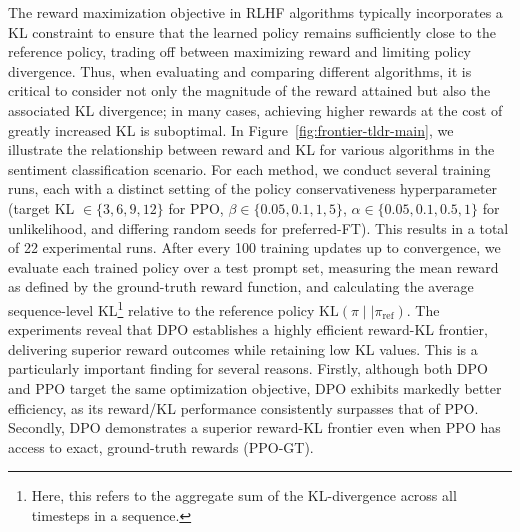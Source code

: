 The reward maximization objective in RLHF algorithms typically incorporates a KL constraint to ensure that the learned policy remains sufficiently close to the reference policy, trading off between maximizing reward and limiting policy divergence. Thus, when evaluating and comparing different algorithms, it is critical to consider not only the magnitude of the reward attained but also the associated KL divergence; in many cases, achieving higher rewards at the cost of greatly increased KL is suboptimal. In Figure~\ref{fig:frontier-tldr-main}, we illustrate the relationship between reward and KL for various algorithms in the sentiment classification scenario. For each method, we conduct several training runs, each with a distinct setting of the policy conservativeness hyperparameter (target KL $\in\{3,6,9,12\}$ for PPO, $\beta \in \{0.05,0.1,1,5\}$, $\alpha\in\{0.05,0.1,0.5,1\}$ for unlikelihood, and differing random seeds for preferred-FT). This results in a total of 22 experimental runs. After every 100 training updates up to convergence, we evaluate each trained policy over a test prompt set, measuring the mean reward as defined by the ground-truth reward function, and calculating the average sequence-level KL\footnote{Here, this refers to the aggregate sum of the KL-divergence across all timesteps in a sequence.} relative to the reference policy $\text{KL}\left(\pi\mid \mid \pi_\text{ref}\right)$. The experiments reveal that DPO establishes a highly efficient reward-KL frontier, delivering superior reward outcomes while retaining low KL values. This is a particularly important finding for several reasons. Firstly, although both DPO and PPO target the same optimization objective, DPO exhibits markedly better efficiency, as its reward/KL performance consistently surpasses that of PPO. Secondly, DPO demonstrates a superior reward-KL frontier even when PPO has access to exact, ground-truth rewards (PPO-GT).

